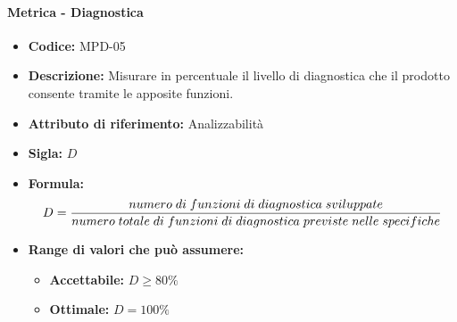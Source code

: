         \paragraph{Metrica - Diagnostica} 
           \begin{itemize}
          \item  \textbf{Codice:} MPD-05
          \item  \textbf{Descrizione:} Misurare in percentuale il livello di diagnostica che il prodotto consente tramite le apposite funzioni.
          \item  \textbf{Attributo di riferimento:} Analizzabilità
         \item   \textbf{Sigla:} $D$
          \item  \textbf{Formula:} $$D = {numero \; di \; funzioni \; di \; diagnostica \; sviluppate \over numero\; totale \; di \; funzioni \; di \; diagnostica \; previste \; nelle \; specifiche }$$

        \item \textbf{Range di valori che può assumere:}
        \begin{itemize}
            \item \textbf{Accettabile:} $D  \geq 80\% $
            \item \textbf{Ottimale:} $D = 100\% $
        \end{itemize}
       \end{itemize}
              
